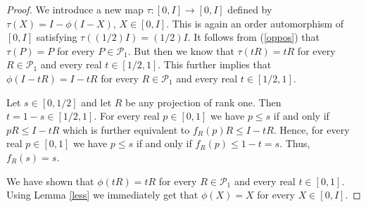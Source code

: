 \documentclass{article}
\begin{document}
\begin{proof}
We introduce a new map $\tau : [0,I] \to [0,I]$ defined by $\tau (X) = I - \phi (I-X)$, $X \in [0,I]$. This is again an order automorphism of $[0,I]$ satisfying $\tau((1/2)I) = (1/2)I$. It follows from (\ref{oppos}) that 
$\tau (P) = P$ for every $P \in \mathcal{P}_1$. But then we know that $\tau (tR) = tR$ for every $R \in \mathcal{P}_1$ and every real $t \in [1/2,1]$. This further implies that $\phi (I -tR) = I -tR$ 
 for every $R \in \mathcal{P}_1$ and every real $t \in [1/2,1]$. 

Let $s \in [0, 1/2]$ and let $R$ be any projection of rank one. Then $t = 1-s \in [1/2 , 1]$. For every real $p \in [0,1]$ we have $p \le s$ if and only if $pR \le I -tR$ which is further equivalent to $f_R (p) R \le I - tR$. Hence, for 
every real $p \in [0,1]$ we have $p \le s$ if and only if $f_R (p) \le 1-t =s$. Thus, $f_R (s) = s$.

We have shown that $\phi (tR) = tR$ for every $R \in \mathcal{P}_1$ and every real $t \in [0,1]$. Using Lemma \ref{less} 
we immediately get that $\phi (X) = X$ for every $X \in [0,I]$.


\end{proof}
\end{document}
